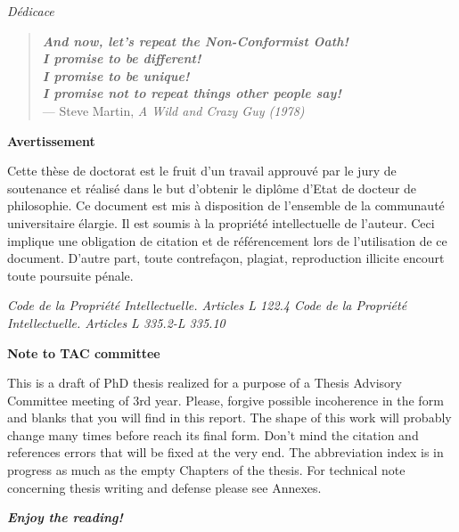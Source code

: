 \documentclass[12pt,]{book}
\theoremstyle{definition}
\theoremstyle{definition}
\theoremstyle{definition}
\theoremstyle{remark}
\begin{document}
\begin{titlepage}
\newpage
\emph{Dédicace}
\vspace*{\fill}

 \begin{quote}
\emph{\textbf{And now, let's repeat the Non-Conformist Oath!\\
I promise to be different!\\
I promise to be unique!\\
I promise not to repeat things other people say!}}\\
— Steve Martin, \textit{A Wild and Crazy Guy (1978)}\\
 \end{quote}
 \vspace*{\fill}


\newpage
\thispagestyle{empty}
\begin{center}
\large{\textbf{Avertissement}}
\end{center}
\vspace{2cm}
Cette thèse de doctorat est le fruit d’un travail approuvé par le jury de soutenance et
réalisé dans le but d’obtenir le diplôme d’Etat de docteur de philosophie. Ce document
est mis à disposition de l’ensemble de la communauté universitaire élargie.
Il est soumis à la propriété intellectuelle de l’auteur. Ceci implique une obligation de
citation et de référencement lors de l’utilisation de ce document.
D’autre part, toute contrefaçon, plagiat, reproduction illicite encourt toute poursuite
pénale.
\vspace*{\fill}

\emph{Code de la Propriété Intellectuelle. Articles L 122.4 \newline
Code de la Propriété Intellectuelle. Articles L 335.2-L 335.10}


\newpage
\thispagestyle{empty}
\begin{center}
\large{\textbf{Note to TAC committee}}
\end{center}
\vspace{2cm}
This is a draft of PhD thesis realized for a purpose of a Thesis Advisory Committee meeting of 3rd year. Please, forgive possible incoherence in the form and blanks that you will find in this report. The shape of this work will probably change many times before reach its final form. Don't mind the citation and references errors that will be fixed at the very end. The abbreviation index is in progress as much as the empty Chapters of the thesis. For technical note concerning thesis writing and defense please see Annexes.

\emph{\textbf{Enjoy the reading!}}

\end{titlepage}
\end{document}
